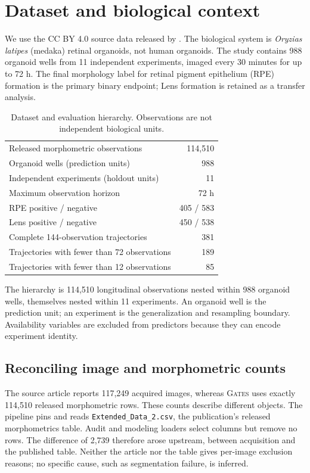 \documentclass[11pt,twocolumn]{article}
\newcommand{\method}{\textsc{Gates}\xspace}
\begin{document}
\section{Dataset and biological context}

We use the CC BY 4.0 source data released by \citet{afting2026orgainoid}. The biological system is
\emph{Oryzias latipes} (medaka) retinal organoids, not human organoids. The study contains 988
organoid wells from 11 independent experiments, imaged every 30 minutes for up to 72 h. The final
morphology label for retinal pigment epithelium (RPE) formation is the primary binary endpoint;
Lens formation is retained as a transfer analysis.

\begin{table}[t]
\centering
\caption{Dataset and evaluation hierarchy. Observations are not independent biological units.}
\label{tab:hierarchy}
\small
\begin{tabularx}{\columnwidth}{@{}>{\raggedright\arraybackslash}X r@{}}
\toprule
Released morphometric observations & 114,510 \\
Organoid wells (prediction units) & 988 \\
Independent experiments (holdout units) & 11 \\
Maximum observation horizon & 72 h \\
RPE positive / negative & 405 / 583 \\
Lens positive / negative & 450 / 538 \\
Complete 144-observation trajectories & 381 \\
Trajectories with fewer than 72 observations & 189 \\
Trajectories with fewer than 12 observations & 85 \\
\bottomrule
\end{tabularx}
\end{table}

The hierarchy is 114,510 longitudinal observations nested within 988 organoid wells, themselves
nested within 11 experiments. An organoid well is the prediction unit; an experiment is the
generalization and resampling boundary. Availability variables are excluded from predictors
because they can encode experiment identity.

\subsection{Reconciling image and morphometric counts}

The source article reports 117,249 acquired images, whereas \method uses exactly 114,510 released
morphometric rows. These counts describe different objects. The pipeline pins and reads
\texttt{Extended\_Data\_2.csv}, the publication's released morphometrics table. Audit and modeling
loaders select columns but remove no rows. The difference of 2,739 therefore arose upstream,
between acquisition and the published table. Neither the article nor the table gives per-image
exclusion reasons; no specific cause, such as segmentation failure, is inferred.
\end{document}
